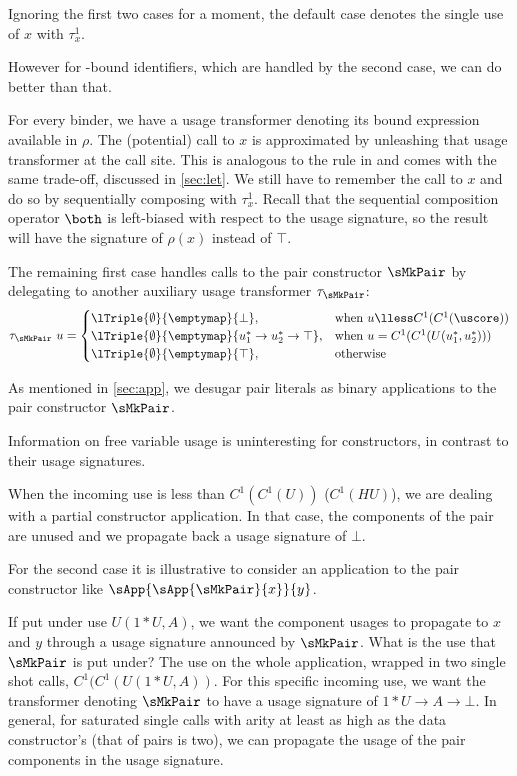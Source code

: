 Ignoring the first two cases for a moment, the default case denotes the single use of $x$ with $\tau^1_x$.

However for -bound identifiers, which are handled by the second case, we can do better than that. 

For every  binder, we have a usage transformer denoting its bound expression available in $\rho$.
The (potential) call to $x$ is approximated by unleashing that usage transformer at the call site.
This is analogous to the  rule in \textcite{card} and comes with the same trade-off, discussed in \cref{sec:let}.
We still have to remember the call to $x$ and do so by sequentially composing with $\tau^1_x$.
Recall that the sequential composition operator $\both$ is left-biased with respect to the usage signature, so the result will have the signature of $\rho(x)$ instead of $\top$.

The remaining first case handles calls to the pair constructor $\sMkPair$ by delegating to another auxiliary usage transformer $\tau_{\sMkPair}$:
\[
\tau_{\sMkPair}~u =
  \begin{cases}
    \lTriple{\emptyset}{\emptymap}{\bot}, & \text{when } u \lless C^1(C^1(\uscore)) \\
    \lTriple{\emptyset}{\emptymap}{u^*_1 \to u^*_2 \to \top}, & \text{when } u = C^1(C^1(U(u^*_1,u^*_2))) \\
    \lTriple{\emptyset}{\emptymap}{\top}, & \text{otherwise}
  \end{cases}
\]

As mentioned in \cref{sec:app}, we desugar pair literals as binary applications to the pair constructor $\sMkPair$.

Information on free variable usage is uninteresting for constructors, in contrast to their usage signatures.

When the incoming use is less than $C^1(C^1(U))$ (\eg $C^1(HU)$), we are dealing with a partial constructor application. 
In that case, the components of the pair are unused and we propagate back a usage signature of $\bot$.

For the second case it is illustrative to consider an application to the pair constructor like $\sApp{\sApp{\sMkPair}{x}}{y}$.

If put under use $U(1*U, A)$, we want the component usages to propagate to $x$ and $y$ through a usage signature announced by $\sMkPair$.
What is the use that $\sMkPair$ is put under? 
The use on the whole application, wrapped in two single shot calls, $C^1(C^1(U(1*U, A))$.
For this specific incoming use, we want the transformer denoting $\sMkPair$ to have a usage signature of $1*U \to A \to \bot$.
In general, for saturated single calls with arity at least as high as the data constructor's (that of pairs is two), we can propagate the usage of the pair components in the usage signature.

